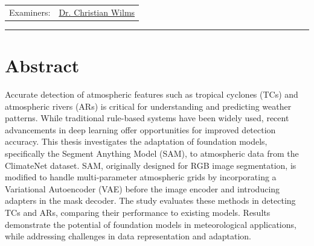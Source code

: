 \documentclass[12pt,final,twoside]{report}
\makeatletter
\newcommand{\trauthor}{Thang Le Phuoc}
\newcommand{\trmatrikelnummer}{7315507}
\newcommand{\trgutachterA}{\href{mailto:christian.wilms@uni-hamburg.de}{Dr. Christian Wilms}}
\theoremstyle{plain}
\theoremstyle{definition}
\theoremstyle{remark}
\makeatother
\begin{document}
\begin{titlepage}
\begin{center}
    \begin{tabular}{ll}
    Examiners: & \trgutachterA \\
    \end{tabular}
    \end{center}
    \vfill
    \rule{\textwidth}{0.4pt}
    \newpage 
\end{titlepage}


\section*{Abstract}\label{sec:abstract}
Accurate detection of atmospheric features such as tropical cyclones (TCs) and atmospheric rivers (ARs) is critical for understanding and predicting weather patterns. While traditional rule-based systems have been widely used, recent advancements in deep learning offer opportunities for improved detection accuracy. This thesis investigates the adaptation of foundation models, specifically the Segment Anything Model (SAM), to atmospheric data from the ClimateNet dataset. SAM, originally designed for RGB image segmentation, is modified to handle multi-parameter atmospheric grids by incorporating a Variational Autoencoder (VAE) before the image encoder and introducing adapters in the mask decoder. The study evaluates these methods in detecting TCs and ARs, comparing their performance to existing models. Results demonstrate the potential of foundation models in meteorological applications, while addressing challenges in data representation and adaptation.\\
\end{document}
